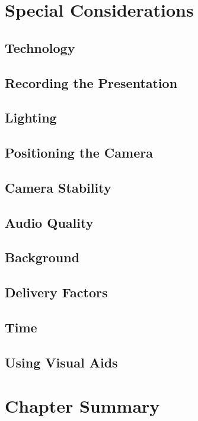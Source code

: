 \documentclass{report}
\begin{document}
    \section{Special Considerations}
        \subsection{Technology}
        \subsection{Recording the Presentation}
        \subsection{Lighting}
        \subsection{Positioning the Camera}
        \subsection{Camera Stability}
        \subsection{Audio Quality}
        \subsection{Background}
        \subsection{Delivery Factors}
        \subsection{Time}
        \subsection{Using Visual Aids}
    \section{Chapter Summary}
\end{document}
